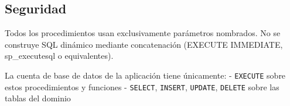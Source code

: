 \documentclass[
11pt,
a4paper,
]{report}
\newcommand{\passthrough}[1]{#1}
\begin{document}
	\hypertarget{seguridad}{%
		\subsection{Seguridad}\label{seguridad}}
	
	Todos los procedimientos usan exclusivamente parámetros nombrados. No se construye SQL dinámico
	mediante concatenación (EXECUTE IMMEDIATE, sp\_executesql o equivalentes).
	
	La cuenta de base de datos de la aplicación tiene únicamente:
	- \passthrough{\lstinline!EXECUTE!} sobre estos procedimientos y funciones
	- \passthrough{\lstinline!SELECT!}, \passthrough{\lstinline!INSERT!}, \passthrough{\lstinline!UPDATE!}, \passthrough{\lstinline!DELETE!} sobre las tablas del dominio
	
\end{document}
